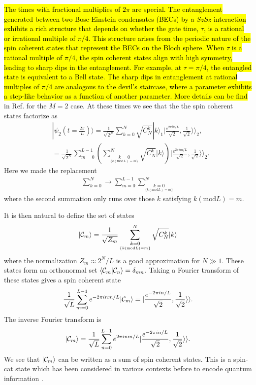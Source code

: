 \documentclass{WileyMSP-template}
\begin{document}
\hl{The times with fractional multiplies of $ 2 \pi  $ are special. The entanglement generated between two Bose-Einstein condensates (BECs) by a $SzSz$ interaction exhibits a rich structure that depends on whether the gate time, $\tau$, is a rational or irrational multiple of $\pi/4$. This structure arises from the periodic nature of the spin coherent states that represent the BECs on the Bloch sphere. When $\tau$ is a rational multiple of $\pi/4$, the spin coherent states align with high symmetry, leading to sharp dips in the entanglement. For example, at $\tau = \pi/4$, the entangled state is equivalent to a Bell state. The sharp dips in entanglement at rational multiples of $\pi/4$ are analogous to the devil's staircase, where a parameter exhibits a step-like behavior as a function of another parameter.  More details can be find} in Ref.  \cite{byrnes2013fractality} for the $M = 2 $ case. At these times we see that the the spin coherent states factorize as
%
\begin{align}
&|\psi_2 (t= \frac{2\pi}{L} )  \rangle=\frac{1}{\sqrt{2^N}}\sum_{k=0}^N \sqrt{C_{N}^{k}}|k\rangle_1  |\frac{e^{2 \pi i k/L }}{\sqrt{2}},\frac{1}{\sqrt{2}}\rangle\rangle_2 ,  \label{firstlinepsi2} \\
& = \frac{1}{\sqrt{2^N}} \sum_{m=0}^{L-1} \left(  \sum^N_{  \underset{  \{ k (\text{mod} L ) =m \} }{k=0} }   \sqrt{C_{N}^{k}}|k\rangle  \right)  |\frac{e^{2 \pi i m/L }}{\sqrt{2}},\frac{1}{\sqrt{2}}\rangle\rangle_2 .
\label{M2psiv2}
\end{align}
%
Here we made the replacement
%
\begin{align}
\sum_{k=0}^N \rightarrow \sum_{m=0}^{L-1} \sum^N_{  \underset{  \{ k (\text{mod} L ) =m \} }{k=0} }
\end{align}
%
where the second summation only runs over those $ k $ satisfying $ k (\text{mod} L) = m $.

It is then natural to define the set of states
%
\begin{align}
|{\cal C}_m \rangle = \frac{1}{\sqrt{Z_m}}  \sum^N_{  \underset{  \{ k (\text{mod} L ) =m \} }{k=0} }  \sqrt{C_{N}^{k}}|k\rangle
\end{align}
%
where the normalization $ Z_m \approx 2^N/L $ is a good approximation for $ N \gg 1 $.  These states form an orthonormal set $ \langle {\cal C}_m | {\cal C}_n \rangle = \delta_{mn} $. Taking a Fourier transform of these states gives a spin coherent state
%
\begin{align}
\frac{1}{\sqrt{L}} \sum_{m=0}^{L-1} e^{-2 \pi i n m/L } |{\cal C}_m \rangle  =| \frac{e^{-2 \pi i n /L }}{\sqrt{2}}, \frac{1}{\sqrt{2}} \rangle \rangle .
\end{align}
%
The inverse Fourier transform is
%
\begin{align}
|{\cal C}_m \rangle = \frac{1}{\sqrt{L}} \sum_{n=0}^{L-1}
e^{2 \pi i n m/L } | \frac{e^{-2 \pi i n /L }}{\sqrt{2}}, \frac{1}{\sqrt{2}} \rangle \rangle .
\label{invfouriercat}
\end{align}
%
We see that $ |{\cal C}_m \rangle$ can be written as a sum of spin coherent states.  This is a spin-cat state which has been considered in various contexts before to encode quantum information \cite{agarwal1997atomic,semenenko2016implementing,qin2021generating,omanakuttan2024fault}.
\end{document}
